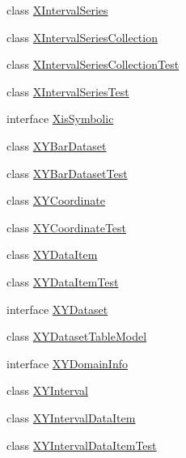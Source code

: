 \begin{DoxyCompactItemize}
\item 
class \mbox{\hyperlink{classorg_1_1jfree_1_1data_1_1xy_1_1_x_interval_series}{X\+Interval\+Series}}
\item 
class \mbox{\hyperlink{classorg_1_1jfree_1_1data_1_1xy_1_1_x_interval_series_collection}{X\+Interval\+Series\+Collection}}
\item 
class \mbox{\hyperlink{classorg_1_1jfree_1_1data_1_1xy_1_1_x_interval_series_collection_test}{X\+Interval\+Series\+Collection\+Test}}
\item 
class \mbox{\hyperlink{classorg_1_1jfree_1_1data_1_1xy_1_1_x_interval_series_test}{X\+Interval\+Series\+Test}}
\item 
interface \mbox{\hyperlink{interfaceorg_1_1jfree_1_1data_1_1xy_1_1_xis_symbolic}{Xis\+Symbolic}}
\item 
class \mbox{\hyperlink{classorg_1_1jfree_1_1data_1_1xy_1_1_x_y_bar_dataset}{X\+Y\+Bar\+Dataset}}
\item 
class \mbox{\hyperlink{classorg_1_1jfree_1_1data_1_1xy_1_1_x_y_bar_dataset_test}{X\+Y\+Bar\+Dataset\+Test}}
\item 
class \mbox{\hyperlink{classorg_1_1jfree_1_1data_1_1xy_1_1_x_y_coordinate}{X\+Y\+Coordinate}}
\item 
class \mbox{\hyperlink{classorg_1_1jfree_1_1data_1_1xy_1_1_x_y_coordinate_test}{X\+Y\+Coordinate\+Test}}
\item 
class \mbox{\hyperlink{classorg_1_1jfree_1_1data_1_1xy_1_1_x_y_data_item}{X\+Y\+Data\+Item}}
\item 
class \mbox{\hyperlink{classorg_1_1jfree_1_1data_1_1xy_1_1_x_y_data_item_test}{X\+Y\+Data\+Item\+Test}}
\item 
interface \mbox{\hyperlink{interfaceorg_1_1jfree_1_1data_1_1xy_1_1_x_y_dataset}{X\+Y\+Dataset}}
\item 
class \mbox{\hyperlink{classorg_1_1jfree_1_1data_1_1xy_1_1_x_y_dataset_table_model}{X\+Y\+Dataset\+Table\+Model}}
\item 
interface \mbox{\hyperlink{interfaceorg_1_1jfree_1_1data_1_1xy_1_1_x_y_domain_info}{X\+Y\+Domain\+Info}}
\item 
class \mbox{\hyperlink{classorg_1_1jfree_1_1data_1_1xy_1_1_x_y_interval}{X\+Y\+Interval}}
\item 
class \mbox{\hyperlink{classorg_1_1jfree_1_1data_1_1xy_1_1_x_y_interval_data_item}{X\+Y\+Interval\+Data\+Item}}
\item 
class \mbox{\hyperlink{classorg_1_1jfree_1_1data_1_1xy_1_1_x_y_interval_data_item_test}{X\+Y\+Interval\+Data\+Item\+Test}}

\end{DoxyCompactItemize}
